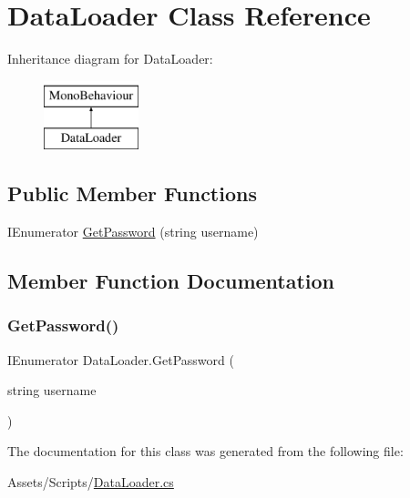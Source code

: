 \hypertarget{classDataLoader}{}\section{Data\+Loader Class Reference}
\label{classDataLoader}
Inheritance diagram for Data\+Loader\+:\begin{figure}[H]
\begin{center}
\leavevmode
\includegraphics[height=2.000000cm]{classDataLoader}
\end{center}
\end{figure}
\subsection*{Public Member Functions}
\begin{DoxyCompactItemize}
\item 
I\+Enumerator \hyperlink{classDataLoader_a71e4a6c884d0906938836c6b5b43e77e}{Get\+Password} (string username)
\end{DoxyCompactItemize}


\subsection{Member Function Documentation}
\mbox{\label{classDataLoader_a71e4a6c884d0906938836c6b5b43e77e}} 
\subsubsection{\texorpdfstring{Get\+Password()}{GetPassword()}}
{\footnotesize\ttfamily I\+Enumerator Data\+Loader.\+Get\+Password (\begin{DoxyParamCaption}\item[{string}]{username }\end{DoxyParamCaption})\hspace{0.3cm}{\ttfamily [inline]}}



The documentation for this class was generated from the following file\+:\begin{DoxyCompactItemize}
\item 
Assets/\+Scripts/\hyperlink{DataLoader_8cs}{Data\+Loader.\+cs}\end{DoxyCompactItemize}
